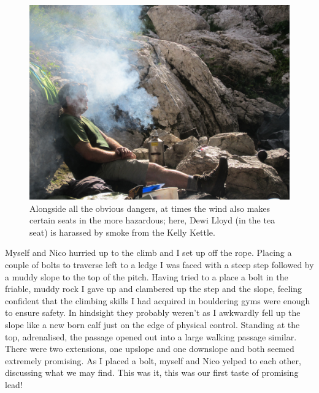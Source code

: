\begin{figure}[t!]
\checkoddpage \ifoddpage \forcerectofloat \else \forceversofloat \fi
   \centering
\includegraphics[width = \textwidth]{2012/piss_bandits/2012-07-28-1835-TharatornSupasiti-IMG_0111--orig.jpg}
\caption{Alongside all the obvious dangers, at times the wind also makes certain seats in the  more hazardous; here, Dewi Lloyd (in the tea seat) is harassed by smoke from the Kelly Kettle. } \label{kettle smoke}
\end{figure}

Myself and Nico hurried up  to the climb and I set up off the
rope. Placing a couple of bolts to traverse left to a ledge I was faced
with a steep step followed by a muddy slope to the top of the pitch.
Having tried to a place a bolt in the friable, muddy rock I gave up and
clambered up the step and the slope, feeling confident that the climbing
skills I had acquired in  bouldering gyms were enough to ensure
safety. In hindsight they probably weren't as I awkwardly fell up the
slope like a new born calf just on the edge of physical control.
Standing at the top, adrenalised, the passage opened out into a large
walking passage similar. There were two extensions, one upslope and one
downslope and both seemed extremely promising. As I placed a bolt,
myself and Nico yelped to each other, discussing what we may find. This
was it, this was our first taste of promising lead!


